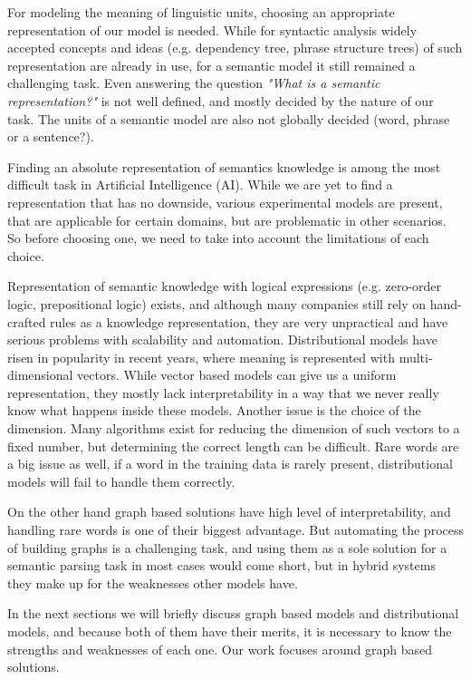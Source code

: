 For modeling the meaning of linguistic units, choosing an appropriate representation of our model is needed. While for syntactic analysis widely accepted concepts and ideas (e.g. dependency tree, phrase structure trees) of such representation are already in use, for a semantic model it still remained a challenging task. Even answering the question \textit{"What is a semantic representation?"} is not well defined, and mostly decided by the nature of our task. The units of a semantic model are also not globally decided (word, phrase or a sentence?).

Finding an absolute representation of semantics knowledge is among the most difficult task in Artificial Intelligence (AI). While we are yet to find a representation that has no downside, various experimental models are present, that are applicable for certain domains, but are problematic in other scenarios. So before choosing one, we need to take into account the limitations of each choice. 


Representation of semantic knowledge with logical expressions (e.g. zero-order logic, prepositional logic) exists, and although many companies still rely on hand-crafted rules as a knowledge representation, they are very unpractical and have serious problems with scalability and automation. Distributional models have risen in popularity in recent years, where meaning is represented with multi-dimensional vectors. While vector based models can give us a uniform representation, they mostly lack interpretability in a way that we never really know what happens inside these models. Another issue is the choice of the dimension. Many algorithms exist for reducing the dimension of such vectors to a fixed number, but determining the correct length can be difficult. Rare words are a big issue as well, if a word in the training data is rarely present, distributional models will fail to handle them correctly.

On the other hand graph based solutions have high level of interpretability, and handling rare words is one of their biggest advantage. But automating the process of building graphs is a challenging task, and using them as a sole solution for a semantic parsing task in most cases would come short, but in hybrid systems they make up for the weaknesses other models have.

 In the next sections we will briefly discuss graph based models and distributional models, and because both of them have their merits, it is necessary to know the strengths and weaknesses of each one. Our work focuses around graph based solutions.

